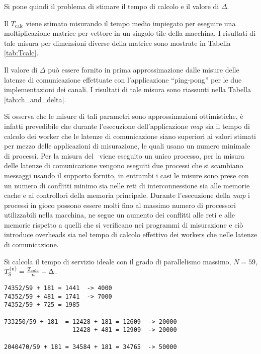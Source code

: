 Si pone quindi il problema di stimare il tempo di calcolo e il valore di $\Delta$. 
\begin{asparaitem}
\item Il $T_{\textrm{calc}}$ viene stimato misurando il tempo medio impiegato per eseguire una moltiplicazione matrice per vettore in un singolo tile della macchina. I risultati di tale misura per dimensioni diverse della matrice sono mostrate in Tabella \ref{tab:Tcalc}.
\item Il valore di $\Delta$ pu\`o essere fornito in prima approssimazione dalle misure delle latenze di comunicazione effettuate con l'applicazione ``ping-pong'' per le due implementazioni dei canali. I risultati di tale misura sono riassunti nella Tabella \ref{tab:ch_and_delta}.
\end{asparaitem}
Si osserva che le misure di tali parametri sono approssimazioni ottimistiche, \`e infatti prevedibile che durante l'esecuzione dell'applicazione \emph{map} sia il tempo di calcolo dei worker che le latenze di comunicazione siano superiori ai valori stimati per mezzo delle applicazioni di misurazione, le quali usano un numero minimale di processi. Per la misura del \Tcalc\ viene eseguito un unico processo, per la misura delle latenze di comunicazione vengono eseguiti due processi che si scambiano messaggi usando il supporto fornito, in entrambi i casi le misure sono prese con un numero di conflitti minimo sia nelle reti di interconnessione sia alle memorie cache e ai controllori della memoria principale. Durante l'esecuzione della \emph{map} i processi in gioco possono essere molti fino al massimo numero di processori utilizzabili nella macchina, ne segue un aumento dei conflitti alle reti e alle memorie rispetto a quelli che si verificano nei programmi di misurazione e ci\`o introduce overheads sia nel tempo di calcolo effettivo dei workers che nelle latenze di comunicazione.

Si calcola il tempo di servizio ideale con il grado di parallelismo massimo, $N = 59$, $T_{\textrm{S}}^{(\textrm{n})} = \frac{T_{\textrm{calc}}}{n} + \Delta$.

\begin{verbatim}
74352/59 + 181 = 1441  -> 4000
74352/59 + 481 = 1741  -> 7000
74352/59 + 725 = 1985

733250/59 + 181  = 12428 + 181 = 12609  -> 20000
                   12428 + 481 = 12909  -> 20000

2040470/59 + 181 = 34584 + 181 = 34765  -> 50000
\end{verbatim}

